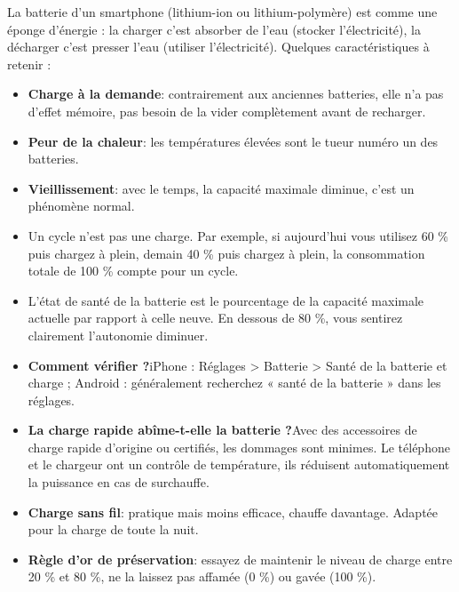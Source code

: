


La batterie d'un smartphone (lithium-ion ou lithium-polymère) est comme une éponge d'énergie : la charger c'est absorber de l'eau (stocker l'électricité), la décharger c'est presser l'eau (utiliser l'électricité). Quelques caractéristiques à retenir :

\begin{itemize}
  \item \textbf{Charge à la demande}: contrairement aux anciennes batteries, elle n'a pas d'effet mémoire, pas besoin de la vider complètement avant de recharger.
  \item \textbf{Peur de la chaleur}: les températures élevées sont le tueur numéro un des batteries.
  \item \textbf{Vieillissement}: avec le temps, la capacité maximale diminue, c'est un phénomène normal.
\end{itemize}


\begin{itemize}
  \item Un cycle n'est pas une charge. Par exemple, si aujourd'hui vous utilisez 60 \% puis chargez à plein, demain 40 \% puis chargez à plein, la consommation totale de 100 \% compte pour un cycle.
  \item L'état de santé de la batterie est le pourcentage de la capacité maximale actuelle par rapport à celle neuve. En dessous de 80 \%, vous sentirez clairement l'autonomie diminuer.
  \item \textbf{Comment vérifier ?}iPhone : Réglages > Batterie > Santé de la batterie et charge ; Android : généralement recherchez « santé de la batterie » dans les réglages.
\end{itemize}


\begin{itemize}
  \item \textbf{La charge rapide abîme-t-elle la batterie ?}Avec des accessoires de charge rapide d'origine ou certifiés, les dommages sont minimes. Le téléphone et le chargeur ont un contrôle de température, ils réduisent automatiquement la puissance en cas de surchauffe.
  \item \textbf{Charge sans fil}: pratique mais moins efficace, chauffe davantage. Adaptée pour la charge de toute la nuit.
  \item \textbf{Règle d'or de préservation}: essayez de maintenir le niveau de charge entre 20 \% et 80 \%, ne la laissez pas affamée (0 \%) ou gavée (100 \%).
\end{itemize}

